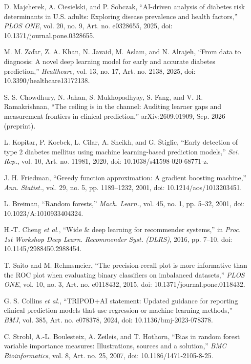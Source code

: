  D. Majcherek, A. Ciesielski, and P. Sobczak, ``AI-driven analysis of diabetes risk determinants in U.S. adults: Exploring disease prevalence and health factors,'' \emph{PLOS ONE}, vol. 20, no. 9, Art. no. e0328655, 2025, doi: 10.1371/journal.pone.0328655.

 M. M. Zafar, Z. A. Khan, N. Javaid, M. Aslam, and N. Alrajeh, ``From data to diagnosis: A novel deep learning model for early and accurate diabetes prediction,'' \emph{Healthcare}, vol. 13, no. 17, Art. no. 2138, 2025, doi: 10.3390/healthcare13172138.

 S. S. Chowdhury, N. Jahan, S. Mukhopadhyay, S. Fang, and V. R. Ramakrishnan, ``The ceiling is in the channel: Auditing learner gaps and measurement frontiers in clinical prediction,'' arXiv:2609.01909, Sep. 2026 (preprint).

 L. Kopitar, P. Kocbek, L. Cilar, A. Sheikh, and G. \v{S}tiglic, ``Early detection of type 2 diabetes mellitus using machine learning-based prediction models,'' \emph{Sci. Rep.}, vol. 10, Art. no. 11981, 2020, doi: 10.1038/s41598-020-68771-z.

 J. H. Friedman, ``Greedy function approximation: A gradient boosting machine,'' \emph{Ann. Statist.}, vol. 29, no. 5, pp. 1189--1232, 2001, doi: 10.1214/aos/1013203451.

 L. Breiman, ``Random forests,'' \emph{Mach. Learn.}, vol. 45, no. 1, pp. 5--32, 2001, doi: 10.1023/A:1010933404324.

 H.-T. Cheng \emph{et al.}, ``Wide \& deep learning for recommender systems,'' in \emph{Proc. 1st Workshop Deep Learn. Recommender Syst. (DLRS)}, 2016, pp. 7--10, doi: 10.1145/2988450.2988454.

 T. Saito and M. Rehmsmeier, ``The precision-recall plot is more informative than the ROC plot when evaluating binary classifiers on imbalanced datasets,'' \emph{PLOS ONE}, vol. 10, no. 3, Art. no. e0118432, 2015, doi: 10.1371/journal.pone.0118432.

 G. S. Collins \emph{et al.}, ``TRIPOD+AI statement: Updated guidance for reporting clinical prediction models that use regression or machine learning methods,'' \emph{BMJ}, vol. 385, Art. no. e078378, 2024, doi: 10.1136/bmj-2023-078378.

 C. Strobl, A.-L. Boulesteix, A. Zeileis, and T. Hothorn, ``Bias in random forest variable importance measures: Illustrations, sources and a solution,'' \emph{BMC Bioinformatics}, vol. 8, Art. no. 25, 2007, doi: 10.1186/1471-2105-8-25.

